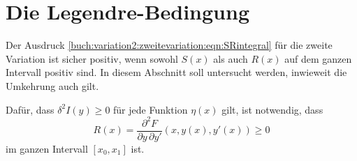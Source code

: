 %
%
%
\section{Die Legendre-Bedingung
\label{buch:variation2:section:legendre}}
Der Ausdruck \eqref{buch:variation2:zweitevariation:eqn:SRintegral}
für die zweite Variation ist sicher positiv, wenn sowohl $S(x)$
als auch $R(x)$ auf dem ganzen Intervall positiv sind.
In diesem Abschnitt soll untersucht werden, inwieweit die
Umkehrung auch gilt.

\begin{satz}
\label{buch:variation2:legendre:satz:legendre}
Dafür, dass $\delta^2I(y)\ge 0$ für jede Funktion $\eta(x)$ gilt, ist
notwendig, dass
\[
R(x)
=
\frac{\partial^2F}{\partial y\,\partial y'}(x,y(x),y'(x))
\ge
0
\]
im ganzen Intervall $[x_0,x_1]$ ist.
\end{satz}

